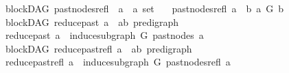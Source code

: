 \begin{isabellebody}
\isanewline
{}\isamarkupfalse%
\ {\isacharparenleft}{\kern0pt}\ blockDAG{\isacharparenright}{\kern0pt}\ past{\isacharunderscore}{\kern0pt}nodes{\isacharunderscore}{\kern0pt}refl\ {\isacharcolon}{\kern0pt}{\isacharcolon}{\kern0pt}\ {\isachardoublequoteopen}{\isacharprime}{\kern0pt}a\ {\isasymRightarrow}\ {\isacharprime}{\kern0pt}a\ set{\isachardoublequoteclose}\isanewline
\ \ \ {\isachardoublequoteopen}past{\isacharunderscore}{\kern0pt}nodes{\isacharunderscore}{\kern0pt}refl\ a\ {\isacharequal}{\kern0pt}\ {\isacharbraceleft}{\kern0pt}b{\isachardot}{\kern0pt}\ a\ {\isasymrightarrow}\isactrlsup {\isacharasterisk}{\kern0pt}\isactrlbsub G\isactrlesub \ b{\isacharbraceright}{\kern0pt}{\isachardoublequoteclose}\isanewline
\isanewline
{}\isamarkupfalse%
\ {\isacharparenleft}{\kern0pt}\ blockDAG{\isacharparenright}{\kern0pt}\ reduce{\isacharunderscore}{\kern0pt}past{\isacharcolon}{\kern0pt}{\isacharcolon}{\kern0pt}\ {\isachardoublequoteopen}{\isacharprime}{\kern0pt}a\ {\isasymRightarrow}\ {\isacharparenleft}{\kern0pt}{\isacharprime}{\kern0pt}a{\isacharcomma}{\kern0pt}{\isacharprime}{\kern0pt}b{\isacharparenright}{\kern0pt}\ pre{\isacharunderscore}{\kern0pt}digraph{\isachardoublequoteclose}\isanewline
\ \ \ \isanewline
\ \ {\isachardoublequoteopen}reduce{\isacharunderscore}{\kern0pt}past\ a\ {\isacharequal}{\kern0pt}\ induce{\isacharunderscore}{\kern0pt}subgraph\ G\ {\isacharparenleft}{\kern0pt}past{\isacharunderscore}{\kern0pt}nodes\ a{\isacharparenright}{\kern0pt}{\isachardoublequoteclose}\isanewline
\isanewline
{}\isamarkupfalse%
\ {\isacharparenleft}{\kern0pt}\ blockDAG{\isacharparenright}{\kern0pt}\ reduce{\isacharunderscore}{\kern0pt}past{\isacharunderscore}{\kern0pt}refl{\isacharcolon}{\kern0pt}{\isacharcolon}{\kern0pt}\ {\isachardoublequoteopen}{\isacharprime}{\kern0pt}a\ {\isasymRightarrow}\ {\isacharparenleft}{\kern0pt}{\isacharprime}{\kern0pt}a{\isacharcomma}{\kern0pt}{\isacharprime}{\kern0pt}b{\isacharparenright}{\kern0pt}\ pre{\isacharunderscore}{\kern0pt}digraph{\isachardoublequoteclose}\isanewline
\ \ \ \isanewline
\ \ {\isachardoublequoteopen}reduce{\isacharunderscore}{\kern0pt}past{\isacharunderscore}{\kern0pt}refl\ a\ {\isacharequal}{\kern0pt}\ induce{\isacharunderscore}{\kern0pt}subgraph\ G\ {\isacharparenleft}{\kern0pt}past{\isacharunderscore}{\kern0pt}nodes{\isacharunderscore}{\kern0pt}refl\ a{\isacharparenright}{\kern0pt}{\isachardoublequoteclose}\isanewline
\ \ \ \ \ \ \ \ \ \ \ \ \ \ \ \ \ \ \ \ \ \ \ \ \ \ \ \ \ \ \ \ \ \ \ \ \ \ \ \ \ \ \isanewline

\end{isabellebody}
